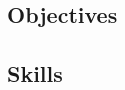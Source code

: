 \documentclass[../CHEFCookingHelperForEveryonesFridge.tex]{subfiles}
\begin{document}
\subsection{Objectives}

\subsection{Skills}

\printbibliography
\end{document}
